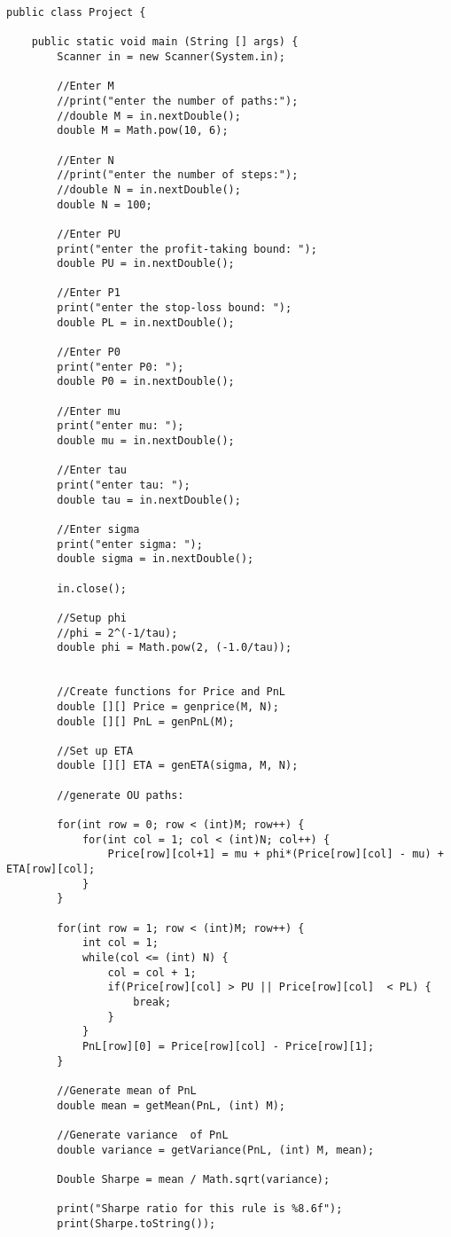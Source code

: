 \documentclass[12pt]{article}
\begin{document}
\begin{enumerate}
\begin{verbatim}
public class Project {

	public static void main (String [] args) {
		Scanner in = new Scanner(System.in); 
		
		//Enter M
		//print("enter the number of paths:"); 
		//double M = in.nextDouble(); 
		double M = Math.pow(10, 6); 
		
		//Enter N
		//print("enter the number of steps:"); 
		//double N = in.nextDouble();
		double N = 100; 
		
		//Enter PU
		print("enter the profit-taking bound: "); 
		double PU = in.nextDouble(); 
		
		//Enter P1
		print("enter the stop-loss bound: "); 
		double PL = in.nextDouble(); 
		
		//Enter P0 
		print("enter P0: "); 
		double P0 = in.nextDouble(); 
		
		//Enter mu 
		print("enter mu: ");
		double mu = in.nextDouble(); 
		
		//Enter tau
		print("enter tau: "); 
		double tau = in.nextDouble(); 
		
		//Enter sigma 
		print("enter sigma: "); 
		double sigma = in.nextDouble(); 
		
		in.close(); 
		
		//Setup phi 
		//phi = 2^(-1/tau);
		double phi = Math.pow(2, (-1.0/tau)); 
		
		
		//Create functions for Price and PnL
		double [][] Price = genprice(M, N); 
		double [][] PnL = genPnL(M); 
		
		//Set up ETA
		double [][] ETA = genETA(sigma, M, N); 
		
		//generate OU paths:
		
		for(int row = 0; row < (int)M; row++) {
			for(int col = 1; col < (int)N; col++) {
				Price[row][col+1] = mu + phi*(Price[row][col] - mu) + ETA[row][col]; 
			}
		}
		
		for(int row = 1; row < (int)M; row++) {
			int col = 1; 
			while(col <= (int) N) {
				col = col + 1; 
				if(Price[row][col] > PU || Price[row][col]  < PL) {
					break; 
				}
			}
			PnL[row][0] = Price[row][col] - Price[row][1]; 
		}

		//Generate mean of PnL
		double mean = getMean(PnL, (int) M); 
		
		//Generate variance  of PnL 
		double variance = getVariance(PnL, (int) M, mean); 
		
		Double Sharpe = mean / Math.sqrt(variance); 
		
		print("Sharpe ratio for this rule is %8.6f"); 
		print(Sharpe.toString()); 
		

\end{verbatim}
\end{enumerate}
\end{document}
